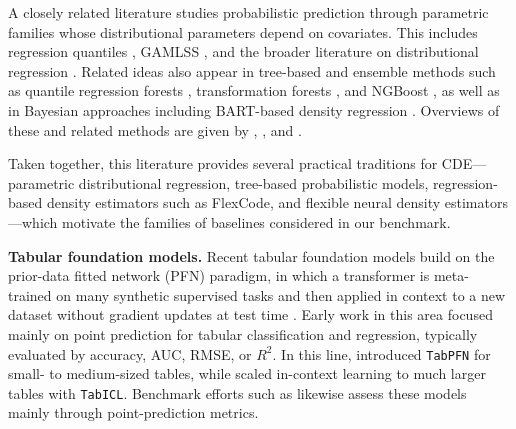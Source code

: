 \documentclass{article}
\newcommand{\method}[1]{\texttt{#1}}
\begin{document}
A closely related literature studies probabilistic prediction through parametric families whose distributional parameters depend on covariates. This includes regression quantiles \citep{koenker1978regression}, GAMLSS \citep{rigby2005generalized}, and the broader literature on distributional regression \citep{kneib2023rage,klein2024distributional}. Related ideas also appear in tree-based and ensemble methods such as quantile regression forests \citep{meinshausen2006quantile}, transformation forests \citep{hothorn2021transformation}, and NGBoost \citep{duan2020ngboost}, as well as in Bayesian approaches including BART-based density regression \citep{chipman2010bart,orlandi2021drbart,li2023adaptive}. Overviews of these and related methods are given by \citet{dalmasso2020cdetools}, \citet{kneib2023rage}, and \citet{klein2024distributional}.

Taken together, this literature provides several practical traditions for CDE---parametric distributional regression, tree-based probabilistic models, regression-based density estimators such as FlexCode, and flexible neural density estimators---which motivate the families of baselines considered in our benchmark.

\textbf{Tabular foundation models.}
Recent tabular foundation models build on the prior-data fitted network (PFN) paradigm, in which a transformer is meta-trained on many synthetic supervised tasks and then applied in context to a new dataset without gradient updates at test time \citep{muller2022transformers,nagler2023statistical}. Early work in this area focused mainly on point prediction for tabular classification and regression, typically evaluated by accuracy, AUC, RMSE, or $R^2$. In this line, \citet{hollmann2025tabpfn} introduced \method{TabPFN} for small- to medium-sized tables, while \citet{qu2025tabicl} scaled in-context learning to much larger tables with \method{TabICL}. Benchmark efforts such as \citet{erickson2025tabarena} likewise assess these models mainly through point-prediction metrics.
\end{document}
